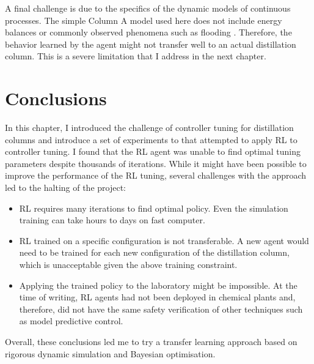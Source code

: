 A final challenge is due to the specifics of the dynamic models of continuous processes. The simple Column A model used here does not include energy balances or commonly observed phenomena such as flooding \cite{Nooraii1998}.  Therefore, the behavior learned by the agent might not transfer well to an actual distillation column. This is a severe limitation that I address in the next chapter.

\section{Conclusions}

In this chapter, I introduced the challenge of controller tuning for distillation columns and introduce a set of experiments to that attempted to apply RL to controller tuning. I found that the RL agent was unable to find optimal tuning parameters despite thousands of iterations. While it might have been  possible to improve the performance of the RL tuning, several challenges with the approach led to the halting of the project:

\begin{itemize}
    \item RL requires many iterations to find optimal policy. Even the simulation training can take hours to days on fast computer.
    \item RL trained on a specific configuration is not transferable. A new agent would need to be trained for each new configuration of the distillation column, which is unacceptable given the above training constraint.
    \item Applying the trained policy to the laboratory might be impossible. At the time of writing, RL agents had not been deployed in chemical plants and, therefore, did not have the same safety verification of other techniques such as model predictive control. 
\end{itemize}

 Overall, these conclusions led me to try a transfer learning approach based on rigorous dynamic simulation and Bayesian optimisation.
